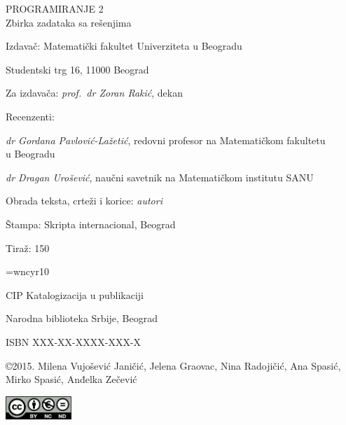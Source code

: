 \noindent
PROGRAMIRANJE 2\\
Zbirka zadataka sa rešenjima
\vspace*{3mm}


\noindent
Izdava\v{c}: Matematički fakultet Univerziteta u Beogradu

Studentski trg 16, 11000 Beograd

\noindent
Za izdava\v{c}a: {\slshape prof.~dr Zoran Rakić}, dekan
\vspace*{3mm}

\noindent
Recenzenti:

\noindent
{\slshape dr Gordana Pavlović-Lažetić}, redovni profesor na Matematičkom fakultetu\\ u Beogradu

\noindent
{\slshape dr Dragan Urošević}, naučni savetnik na Matematičkom institutu SANU
\vspace*{3mm}

\noindent
Obrada teksta, crteži i korice: {\slshape autori}


\ifstampanaverzija
\noindent
Štampa: Skripta internacional, Beograd 

\noindent
Tiraž: 150
\vspace*{3mm}


\font\cyr=wncyr10

\noindent
CIP {\cyr Katalogizacija u publikaciji} 

\noindent
{\cyr Narodna biblioteka Srbije, Beograd}
\vspace*{1mm}

\else 
  \noindent ISBN XXX-XX-XXXX-XXX-X \vspace*{1cm}
\fi



\noindent
\copyright 2015. Milena Vujošević Janičić, Jelena Graovac, Nina Radojičić, Ana Spasić, Mirko Spasić, Anđelka Zečević



\vspace*{1mm}
\noindent\includegraphics[width=2.5cm]{cc.png}

\newpage
